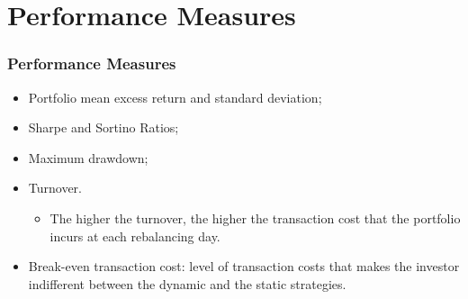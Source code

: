\documentclass[pdf,10pt,xcolor=dvipsnames,hide notes]{beamer}
\begin{document}
\section{Performance Measures}

\begin{frame}
\frametitle{Performance Measures}

\begin{itemize}
	
	\setlength{\parskip}{15pt}



\item Portfolio mean excess return and standard deviation;

\item Sharpe and Sortino Ratios;

\item Maximum drawdown;

\item Turnover.

\setlength{\parskip}{0pt}

\begin{itemize}
	\item The higher the turnover, the higher the transaction cost that the portfolio incurs at each rebalancing day.
\end{itemize}

\setlength{\parskip}{15pt}

\item Break-even transaction cost:  level of transaction costs that makes the investor indifferent between the dynamic and the static strategies.


\end{itemize}
\end{frame}
\end{document}
